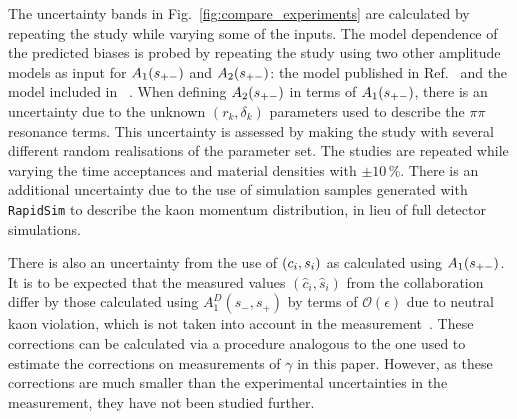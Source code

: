 The uncertainty bands in Fig.~\ref{fig:compare_experiments} are calculated by repeating the study while varying some of the inputs. The model dependence of the predicted biases is probed by repeating the study using two other amplitude models as input for $A_1(s_{+-})$ and $A_2(s_{+-})$: the model published in Ref.~\cite{BELLE2010} and the model included in \normalfont~\cite{EvtGen}. 
When defining $A_2(s_{+-})$ in terms of $A_1(s_{+-})$, there is an uncertainty due to the unknown $(r_k, \delta_k)$ parameters used to describe the $\pi\pi$ resonance terms. This uncertainty is assessed by making the study with several different random realisations of the parameter set. 
The studies are repeated while varying the time acceptances and material densities with $\pm 10\,\%$. 
There is an additional uncertainty due to the use of simulation samples generated with \texttt{RapidSim} to describe the kaon momentum distribution, in lieu of full detector simulations. 

There is also an uncertainty from the use of $(c_i, s_i)$ as calculated using $A_1(s_{+-})$. It is to be expected that the measured values $(\hat c_i, \hat s_i)$ from the \cleo collaboration differ by those calculated using $A_1^D(s_-,s_+)$ by terms of $\mathcal O(\epsilon)$ due to neutral kaon \CP violation, which is not taken into account in the measurement~\cite{CLEOCISI}. These corrections can be calculated via a procedure analogous to the one used to estimate the corrections on measurements of $\gamma$ in this paper. However, as these corrections are much smaller than the experimental uncertainties in the measurement, they have not been studied further.



